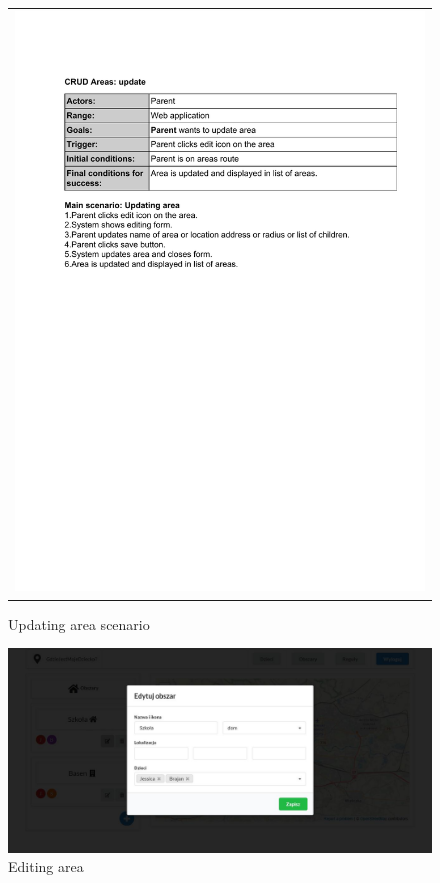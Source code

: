 \documentclass{sprawozdanie-agh}
\begin{document}
    	\begin{figure}[H]
    		\centering
    		\begin{tabular}{c}
    			\includegraphics[width=.80\textwidth]{upA_cropped}
    		\end{tabular}
    		\caption{Updating area scenario}
    	\end{figure}

    	\begin{figure}[H]
    		\centering
    		\includegraphics[width=.80\textwidth]{editArea}
    		\caption{Editing area}
    	\end{figure}
\end{document}
